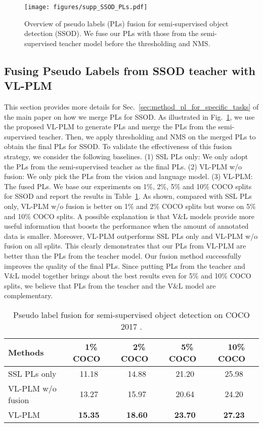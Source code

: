 \documentclass[runningheads]{llncs}
\begin{document}
\begin{figure}[b]\centering
    \texttt{[image: figures/supp\_SSOD\_PLs.pdf]}
\caption{Overview of pseudo labels (PLs) fusion for semi-supervised object detection (SSOD). We fuse our PLs with those from the semi-supervised teacher model before the thresholding and NMS. }
    \label{fig:ssod_pls}
\end{figure}


\subsection{Fusing Pseudo Labels from SSOD teacher with VL-PLM}\label{subsec:fusion_PL}

This section provides more details for Sec.~\ref{sec:method_pl_for_specific_tasks} of the main paper on how we merge PLs for SSOD.
As illustrated in Fig.~\ref{fig:ssod_pls}, we use the proposed VL-PLM to generate PLs and merge the PLs from the semi-supervised teacher. Then, we apply thresholding and NMS on the merged PLs to obtain the final PLs for SSOD.
To validate the effectiveness of this fusion strategy, we consider the following baselines. 
(1) SSL PLs only: We only adopt the PLs from the semi-supervised teacher as the final PLs.
(2) VL-PLM w/o fusion: We only pick the PLs from the vision and language model.
(3) VL-PLM: The fused PLs.
We base our experiments on 1\%, 2\%, 5\% and 10\% COCO splits \cite{COCO,sohn2020detection} for SSOD and report the results in Table~\ref{table:ssod_pl_fusion}. 
As shown, compared with SSL PLs only, VL-PLM w/o fusion is better on 1\% and 2\% COCO splits but worse on 5\% and 10\% COCO splits. A possible explanation is that V\&L models provide more useful information that boosts the performance when the amount of annotated data is smaller.
Moreover, VL-PLM outperforms SSL PLs only and VL-PLM w/o fusion on all splits. This clearly demonstrates that our PLs from VL-PLM are better than the PLs from the teacher model. Our fusion method successfully improves the quality of the final PLs.
Since putting PLs from the teacher and V\&L model together brings about the best results even for 5\% and 10\% COCO splits, we believe that PLs from the teacher and the V\&L model are complementary.


\begin{table}[tb]
\begin{center}
\caption{Pseudo label fusion for semi-supervised object detection on COCO 2017 \cite{COCO}. 
}
\label{table:ssod_pl_fusion}
\begin{tabular}{l c c c c}
\toprule
Methods\  & \ 1\% COCO\  & \ 2\% COCO\  & \ 5\% COCO\  & \ 10\% COCO\ \\
\hline
SSL PLs only       & 11.18 & 14.88 & 21.20 & 25.98 \\
VL-PLM w/o fusion  & 13.27 & 15.97 & 20.64 & 24.20 \\
VL-PLM             & \bf{15.35} & \bf{18.60} & \bf{23.70} & \bf{27.23} \\
\bottomrule
\end{tabular}
\end{center}
\end{table}
\end{document}
